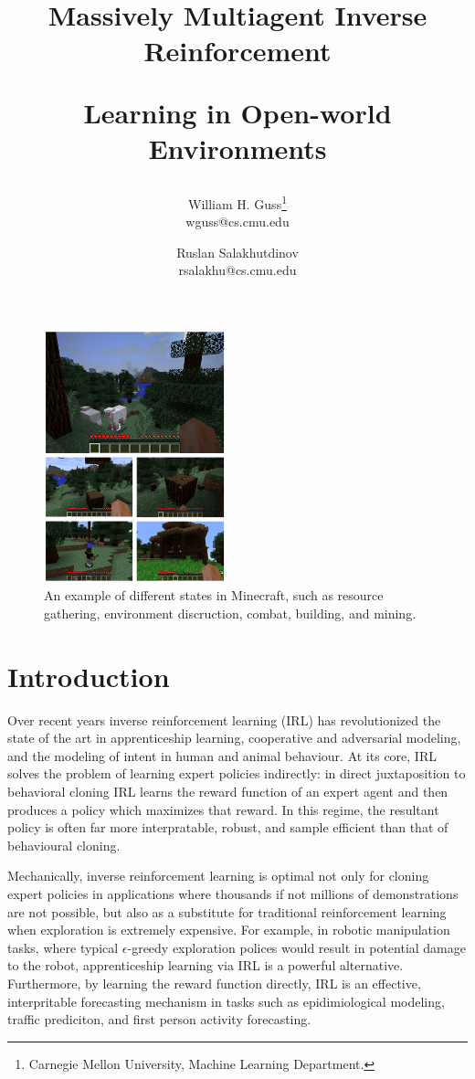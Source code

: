 \documentclass[11pt]{article}
\title{
 \begin{minipage}[c]{1.05\textwidth}
 	\centerline{Massively Multiagent Inverse Reinforcement}
 	\centerline{ Learning in Open-world Environments}
 \end{minipage}
}
\author{
	\vspace{1cm}
	William H. Guss\thanks{Carnegie Mellon University, Machine Learning Department.}\\[-1cm]
	wguss@cs.cmu.edu \and
	Ruslan Salakhutdinov\footnotemark[1] \\
	rsalakhu@cs.cmu.edu
}
\begin{document}
\maketitle
\thispagestyle{empty}


\setcounter{page}{1}



\vspace{-10pt}
\belowcaptionskip -21pt
\begin{figure}
\centering \includegraphics[width=0.47\textwidth]{mc_combined.png}
\caption{An example of different states in Minecraft, such as resource gathering, environment discruction, combat, building, and mining.}
\end{figure}

\section{Introduction}

Over recent years inverse reinforcement learning (IRL) has revolutionized the state of the art in apprenticeship learning, cooperative and adversarial modeling, and the modeling of intent in human and animal behaviour. At its core, IRL solves the problem of learning expert policies indirectly: in direct juxtaposition to behavioral cloning IRL learns the reward function of an expert agent and then produces a policy which maximizes that reward. In this regime, the resultant policy is often far more interpratable, robust, and sample efficient than that of behavioural cloning. 

Mechanically, inverse reinforcement learning is optimal not only for cloning expert policies in applications where thousands if not millions of demonstrations are not possible, but also as a substitute for traditional reinforcement learning when exploration is extremely expensive. For example, in robotic manipulation tasks, where typical $\epsilon$-greedy exploration polices would result in potential damage to the robot, apprenticeship learning via IRL is a powerful alternative. Furthermore, by learning the reward function directly, IRL is an effective, interpritable forecasting mechanism in tasks such as epidimiological modeling, traffic prediciton, and first person activity forecasting.
\end{document}
